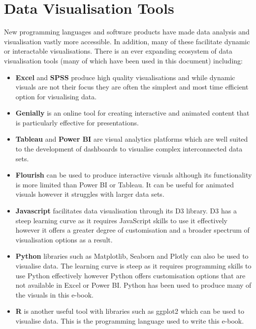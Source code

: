 \documentclass[
]{book}
\providecommand{\tightlist}{%
  \setlength{\itemsep}{0pt}\setlength{\parskip}{0pt}}
\begin{document}
\hypertarget{data-visualisation-tools}{%
\section{Data Visualisation Tools}\label{data-visualisation-tools}}

New programming languages and software products have made data analysis and visualisation vastly more accessible. In addition, many of these facilitate dynamic or interactable visualisations. There is an ever expanding ecosystem of data visualisation tools (many of which have been used in this document) including:

\begin{itemize}
\tightlist
\item
  \textbf{Excel} and \textbf{SPSS} produce high quality visualisations and while dynamic visuals are not their focus they are often the simplest and most time efficient option for visualising data.
\item
  \textbf{Genially} is an online tool for creating interactive and animated content that is particularly effective for presentations.
\item
  \textbf{Tableau} and \textbf{Power BI} are visual analytics platforms which are well suited to the development of dashboards to visualise complex interconnected data sets.
\item
  \textbf{Flourish} can be used to produce interactive visuals although its functionality is more limited than Power BI or Tableau. It can be useful for animated visuals however it struggles with larger data sets.
\item
  \textbf{Javascript} facilitates data visualisation through its D3 library. D3 has a steep learning curve as it requires JavaScript skills to use it effectively however it offers a greater degree of customisation and a broader spectrum of visualisation options as a result.
\item
  \textbf{Python} libraries such as Matplotlib, Seaborn and Plotly can also be used to visualise data. The learning curve is steep as it requires programming skills to use Python effectively however Python offers customisation options that are not available in Excel or Power BI. Python has been used to produce many of the visuals in this e-book.
\item
  \textbf{R} is another useful tool with libraries such as ggplot2 which can be used to visualise data. This is the programming language used to write this e-book.
\end{itemize}
\end{document}
